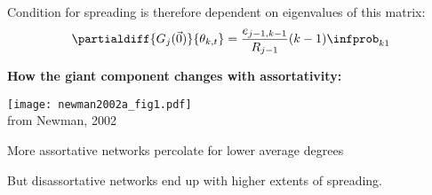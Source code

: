     Condition for spreading is therefore
    dependent on eigenvalues of this matrix:
    $$
    \partialdiff{G_j(\vec{0})}{\theta_{k,t}} 
    = 
    \frac{e_{j-1,k-1}}{R_{j-1}}
    (k-1)
    \infprob_{k1}
    $$



  \textbf{How the giant component changes with assortativity:}

      
    \texttt{[image: newman2002a\_fig1.pdf]}\\
    {\tiny from Newman, 2002\cite{newman2002a}}
    
    
     
      More assortative networks percolate for
      lower average degrees
     
      But disassortative networks end up with
      higher extents of spreading.
    
  




